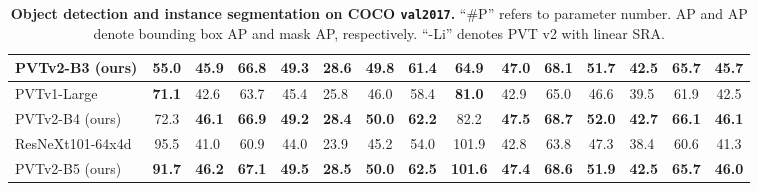 \documentclass[10pt,twocolumn,letterpaper]{article}
\begin{document}
\begin{table*}[t]
\begin{tabular}{l|c|lcc|lcc|c|lcc|lcc}
PVTv2-B3 (ours) &55.0&\textbf{45.9} & \textbf{66.8} & \textbf{49.3} & \textbf{28.6} & \textbf{49.8} & \textbf{61.4} & 64.9& \textbf{47.0} & \textbf{68.1} & \textbf{51.7} &\textbf{42.5} & \textbf{65.7} &\textbf{45.7} \\
\hline
PVTv1-Large~\cite{pvt} & \textbf{71.1} & {42.6} & {63.7} & {45.4} & {25.8} & {46.0} & {58.4} & \textbf{81.0}& {42.9}& {65.0} & 46.6 &{39.5}& {61.9}& {42.5}  \\
PVTv2-B4 (ours) &72.3&\textbf{46.1} & \textbf{66.9} & \textbf{49.2} & \textbf{28.4} & \textbf{50.0} & \textbf{62.2} &82.2& \textbf{47.5} &\textbf{68.7} & \textbf{52.0} & \textbf{42.7} & \textbf{66.1} &\textbf{46.1} \\
\hline
ResNeXt101-64x4d~\cite{xie2017aggregated} & 95.5& 41.0 & 60.9 & 44.0 & 23.9 & 45.2 & 54.0 &101.9 & 42.8 & 63.8 & {47.3} & 38.4 & 60.6 & 41.3 \\
PVTv2-B5 (ours) &\textbf{91.7} &\textbf{46.2} & \textbf{67.1} & \textbf{49.5} & \textbf{28.5} & \textbf{50.0} & \textbf{62.5} &\textbf{101.6}&\textbf{47.4} &\textbf{68.6} & \textbf{51.9} & \textbf{42.5} & \textbf{65.7}& \textbf{46.0}\\
\end{tabular} 		\caption{\textbf{Object detection and instance segmentation on COCO \texttt{val2017}.} 
			``\#P'' refers to parameter number. AP and AP denote bounding box AP and mask AP, respectively. 
			``-Li'' denotes PVT v2 with linear SRA.
		}
		\label{tab:det_base} 
	\end{table*}
	
\end{document}
